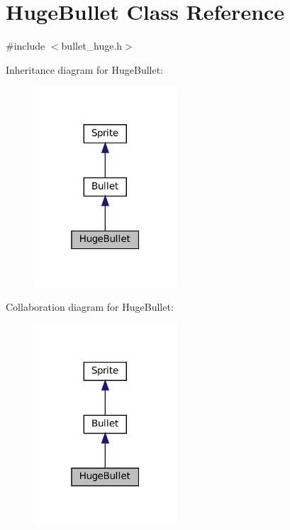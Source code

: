 \hypertarget{classHugeBullet}{}\section{Huge\+Bullet Class Reference}
\label{classHugeBullet}


{\ttfamily \#include $<$bullet\+\_\+huge.\+h$>$}



Inheritance diagram for Huge\+Bullet\+:\nopagebreak
\begin{figure}[H]
\begin{center}
\leavevmode
\includegraphics[width=151pt]{classHugeBullet__inherit__graph}
\end{center}
\end{figure}


Collaboration diagram for Huge\+Bullet\+:\nopagebreak
\begin{figure}[H]
\begin{center}
\leavevmode
\includegraphics[width=151pt]{classHugeBullet__coll__graph}
\end{center}
\end{figure}
